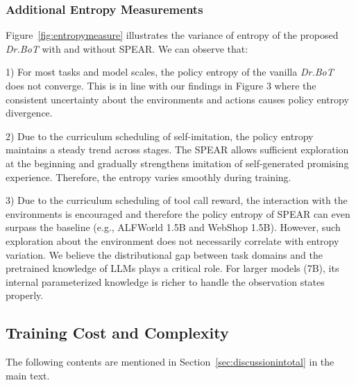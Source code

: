 \documentclass[]{youtu} %
\begin{document}
\subsubsection{Additional Entropy Measurements}

Figure~\ref{fig:entropymeasure} illustrates the variance of entropy of the proposed \textit{Dr.BoT} with and without SPEAR. We can observe that:

1) For most tasks and model scales, the policy entropy of the vanilla \textit{Dr.BoT} does not converge. This is in line with our findings in Figure 3 where the consistent uncertainty about the environments and actions causes policy entropy divergence.

2) Due to the curriculum scheduling of self-imitation, the policy entropy maintains a steady trend across stages. The SPEAR allows sufficient exploration at the beginning and gradually strengthens imitation of self-generated promising experience. Therefore, the entropy varies smoothly during training.

3) Due to the curriculum scheduling of tool call reward, the interaction with the environments is encouraged and therefore the policy entropy of SPEAR can even surpass the baseline (e.g., ALFWorld 1.5B and WebShop 1.5B). However, such exploration about the environment does not necessarily correlate with entropy variation. We believe the distributional gap between task domains and the pretrained knowledge of LLMs plays a critical role. For larger models (7B), its internal parameterized knowledge is richer to handle the observation states properly.




\subsection{Training Cost and Complexity}
\label{sec:trainingcost}

The following contents are mentioned in Section~\ref{sec:discussionintotal} in the main text.
\end{document}
